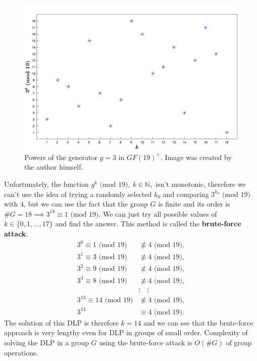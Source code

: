 \documentclass[thesis=M,english]{FITthesis}[2012/10/20]
\theoremstyle{remark}
\theoremstyle{definition}
\begin{document}
 \begin{figure}[h]
\hspace*{-2cm}
 	\includegraphics[width=1.25\textwidth]{graph3in19.png}
 	\caption[Example of the group structure of $GF(19)^\times$.]{Powers of the generator $g = 3$ in $GF(19)^\times$. Image was created by the author himself.}
 	\label{fig2}
 \end{figure}
\noindent Unfortunately, the function $g^k \text{ (mod 19)},\ k \in \mathbb{N},$ isn't monotonic, therefore we can't use the idea of trying a randomly selected $k_0$ and comparing $3^{k_0} \text{ (mod 19)}$ with $4$, but we can use the fact that the group $G$ is finite and its order is $\#G = 18 \implies 3^{18} \equiv 1 \text{ (mod 19)}.$ We can just try all possible values of $k \in \{0, 1, \ldots, 17\}$ and find the answer. This method is called the \textbf{brute-force attack}. 
\begin{align*}
3^0 \equiv 1 \text{ (mod 19)} &\not\equiv 4 \text{ (mod 19)}, \\
3^1 \equiv 3 \text{ (mod 19)} &\not\equiv 4 \text{ (mod 19)}, \\
3^2 \equiv 9 \text{ (mod 19)} &\not\equiv 4 \text{ (mod 19)}, \\
3^3 \equiv 8 \text{ (mod 19)} &\not\equiv 4 \text{ (mod 19)}, \\
&\vdots \quad \vdots \\
3^{13} \equiv 14 \text{ (mod 19)} &\not\equiv 4 \text{ (mod 19)}, \\
3^{14} &\equiv 4 \text{ (mod 19)}.
\end{align*}
The solution of this DLP is therefore $k = 14$ and we can see that the brute-force approach is very lengthy even for DLP in groups of small order. Complexity of solving the DLP in a group $G$ using the brute-force attack is $O(\#G)$ of group operations.
\end{document}
